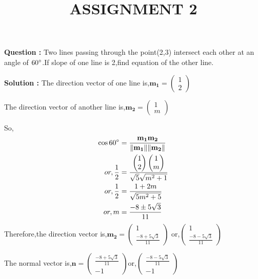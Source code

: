\documentclass[12pt]{article}
\let\vec\mathbf
\providecommand{\norm}[1]{\ensuremath{\lVert#1\rVert}}
\begin{document}
\title{\textbf{ASSIGNMENT 2}}
\date{}
\maketitle
\textbf{Question :} Two lines passing through the point(2,3) intersect each other at an angle of $60\degree$.If slope of one line is 2,find equation of the other line.

\textbf{Solution :}
The direction vector of one line is,$\vec{m_1}=\begin{pmatrix}
    1\\2
\end{pmatrix}$

The direction vector of another line is,$\vec{m_2}=\begin{pmatrix}
    1\\m
\end{pmatrix}$


So,
\begin{align}
  \cos{60\degree}&=\frac{\vec{m_1m_2}}{\vec{\norm{m_1}\norm{m_2}}}\\
    or,\frac{1}{2}&=\frac{\begin{pmatrix}
        1\\2
    \end{pmatrix}\begin{pmatrix}
        1\\m
    \end{pmatrix}}{\sqrt{5}\sqrt{m^2+1}}\\
   or, \frac{1}{2}&=\frac{1+2m}{\sqrt{5m^2+5}}\\
   or, m&=\frac{-8\pm5\sqrt{3}}{11}    
\end{align}
Therefore,the direction vector is,$\vec{m_2}=\begin{pmatrix}
    1\\\frac{-8+5\sqrt{3}}{11}
\end{pmatrix}$ or,$\begin{pmatrix}
    1\\\frac{-8-5\sqrt{3}}{11}\end{pmatrix}$

The normal vector is,$\vec{n}=\begin{pmatrix}
    \frac{-8+5\sqrt{3}}{11}\\-1
\end{pmatrix}$or,$\begin{pmatrix}
    \frac{-8-5\sqrt{3}}{11}\\-1
\end{pmatrix}$
\end{document}
